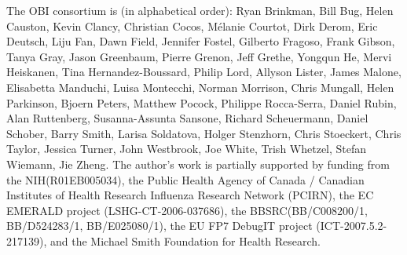 \documentclass{ao2e}%
\begin{document}
The OBI consortium is (in alphabetical order): Ryan Brinkman, Bill Bug, Helen Causton, Kevin Clancy, Christian Cocos, M\'elanie Courtot, Dirk Derom, Eric Deutsch, Liju Fan, Dawn Field, Jennifer Fostel, Gilberto Fragoso, Frank Gibson, Tanya Gray, Jason Greenbaum, Pierre Grenon, Jeff Grethe, Yongqun He, Mervi Heiskanen, Tina Hernandez-Boussard, Philip Lord, Allyson Lister, James Malone, Elisabetta Manduchi, Luisa Montecchi, Norman Morrison, Chris Mungall, Helen Parkinson, Bjoern Peters, Matthew Pocock, Philippe Rocca-Serra, Daniel Rubin, Alan Ruttenberg, Susanna-Assunta Sansone, Richard Scheuermann, Daniel Schober, Barry Smith, Larisa Soldatova, Holger Stenzhorn, Chris Stoeckert, Chris Taylor, Jessica Turner, John Westbrook,  Joe White, Trish Whetzel, Stefan Wiemann, Jie Zheng. 
The author's work is partially supported by funding from the NIH(R01EB005034),  the Public Health Agency of Canada / Canadian Institutes of Health Research Influenza Research Network (PCIRN), the EC EMERALD project (LSHG-CT-2006-037686), the BBSRC(BB/C008200/1, BB/D524283/1, BB/E025080/1), the EU FP7 DebugIT project (ICT-2007.5.2-217139), and the Michael Smith Foundation for Health Research.
\end{document}
